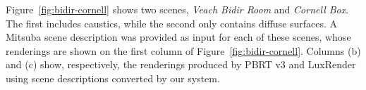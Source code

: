 Figure~\ref{fig:bidir-cornell} shows two scenes, \textit{Veach Bidir Room} and \textit{Cornell Box}. The first includes caustics, while the second only contains diffuse surfaces. A Mitsuba scene description was provided as input for each of these scenes, whose renderings are shown on the first column of Figure~\ref{fig:bidir-cornell}. Columns (b) and (c) show, respectively, the renderings produced by PBRT v3 and LuxRender using scene descriptions converted by our system.    

\begin{figure}[h!t]
	\centering
	
\end{figure}
